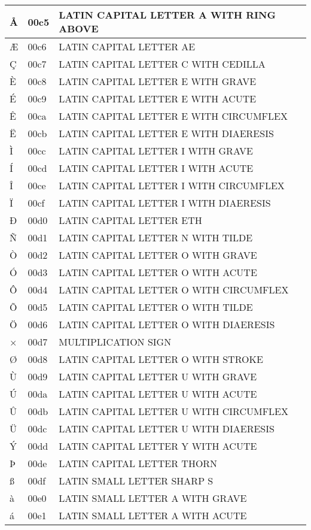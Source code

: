 \documentclass[12pt,letterpaper,openany]{book}
\begin{document}
\begin{center}
\begin{supertabular}{|m{0.25in}|m{0.5in}|m{4in}|}
Å & 00c5 & LATIN CAPITAL LETTER A WITH RING ABOVE\\\hline
Æ & 00c6 & LATIN CAPITAL LETTER AE\\\hline
Ç & 00c7 & LATIN CAPITAL LETTER C WITH CEDILLA\\\hline
È & 00c8 & LATIN CAPITAL LETTER E WITH GRAVE\\\hline
É & 00c9 & LATIN CAPITAL LETTER E WITH ACUTE\\\hline
Ê & 00ca & LATIN CAPITAL LETTER E WITH CIRCUMFLEX\\\hline
Ë & 00cb & LATIN CAPITAL LETTER E WITH DIAERESIS\\\hline
Ì & 00cc & LATIN CAPITAL LETTER I WITH GRAVE\\\hline
Í & 00cd & LATIN CAPITAL LETTER I WITH ACUTE\\\hline
Î & 00ce & LATIN CAPITAL LETTER I WITH CIRCUMFLEX\\\hline
Ï & 00cf & LATIN CAPITAL LETTER I WITH DIAERESIS\\\hline
Ð & 00d0 & LATIN CAPITAL LETTER ETH\\\hline
Ñ & 00d1 & LATIN CAPITAL LETTER N WITH TILDE\\\hline
Ò & 00d2 & LATIN CAPITAL LETTER O WITH GRAVE\\\hline
Ó & 00d3 & LATIN CAPITAL LETTER O WITH ACUTE\\\hline
Ô & 00d4 & LATIN CAPITAL LETTER O WITH CIRCUMFLEX\\\hline
Õ & 00d5 & LATIN CAPITAL LETTER O WITH TILDE\\\hline
Ö & 00d6 & LATIN CAPITAL LETTER O WITH DIAERESIS\\\hline
× & 00d7 & MULTIPLICATION SIGN\\\hline
Ø & 00d8 & LATIN CAPITAL LETTER O WITH STROKE\\\hline
Ù & 00d9 & LATIN CAPITAL LETTER U WITH GRAVE\\\hline
Ú & 00da & LATIN CAPITAL LETTER U WITH ACUTE\\\hline
Û & 00db & LATIN CAPITAL LETTER U WITH CIRCUMFLEX\\\hline
Ü & 00dc & LATIN CAPITAL LETTER U WITH DIAERESIS\\\hline
Ý & 00dd & LATIN CAPITAL LETTER Y WITH ACUTE\\\hline
Þ & 00de & LATIN CAPITAL LETTER THORN\\\hline
ß & 00df & LATIN SMALL LETTER SHARP S\\\hline
à & 00e0 & LATIN SMALL LETTER A WITH GRAVE\\\hline
á & 00e1 & LATIN SMALL LETTER A WITH ACUTE\\\hline

\end{supertabular}
\end{center}
\end{document}
